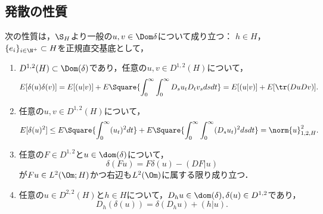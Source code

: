 \documentclass[uplatex,dvipdfmx]{jsreport}
\begin{document}
\subsection{発散の性質}

\begin{proposition}
    次の性質は，$\S_H$より一般の$u,v\in\Dom\delta$について成り立つ：
    $h\in H$，$\{e_i\}_{i\in\N^+}\subset H$を正規直交基底として，
    \begin{enumerate}
        \item $D^{1,2}(H)\subset\Dom(\delta)$であり，任意の$u,v\in D^{1,2}(H)$について，
        \[E[\delta(u)\delta(v)]=E[(u|v)]+E\Square{\int^\infty_0\int^\infty_0D_su_tD_tv_sdsdt}=E[(u|v)]+E[\tr(DuDv)].\]
        \item 任意の$u,v\in D^{1,2}(H)$について，
        \[E[\delta(u)^2]\le E\Square{\int^\infty_0(u_t)^2dt}+E\Square{\int^\infty_0\int^\infty_0(D_su_t)^2dsdt}=\norm{u}^2_{1,2,H}.\]
        \item 任意の$F\in D^{1,2}$と$u\in\dom(\delta)$について，
        \[\delta(Fu)=F\delta(u)-(DF|u)\]
        が$Fu\in L^2(\Om;H)$かつ右辺も$L^2(\Om)$に属する限り成り立つ．
        \item 任意の$u\in D^{2,2}(H)$と$h\in H$について，$D_hu\in\dom(\delta),\delta(u)\in D^{1,2}$であり，
        \[D_h(\delta(u))=\delta(D_hu)+(h|u).\]
    \end{enumerate}
\end{proposition}
\end{document}
